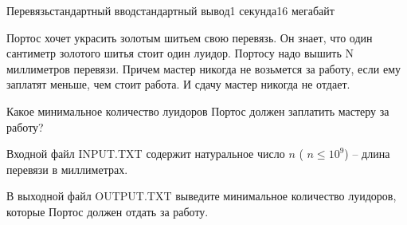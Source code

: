 \begin{problem}{Перевязь}{стандартный ввод}{стандартный вывод}{1 секунда}{16 мегабайт}

Портос хочет украсить золотым шитьем свою перевязь. Он знает, что один сантиметр золотого шитья стоит один луидор. Портосу надо вышить N миллиметров перевязи. Причем мастер никогда не возьмется за работу, если ему заплатят меньше, чем стоит работа. И сдачу мастер никогда не отдает.

Какое минимальное количество луидоров Портос должен заплатить мастеру за работу?

\InputFile
Входной файл INPUT.TXT содержит натуральное число $n$ ( $n \leq 10^9$) -- длина перевязи в миллиметрах.

\OutputFile
В выходной файл OUTPUT.TXT выведите минимальное количество луидоров, которые Портос должен отдать за работу.

\Examples

\begin{example}
%
%
\end{example}

\end{problem}

